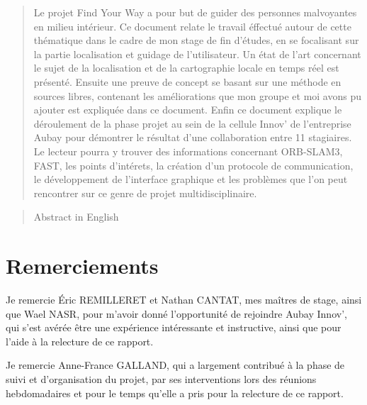 \documentclass[11pt]{article}
\begin{document}
  \begin{abstract}

    Le projet Find Your Way a pour but de guider des personnes malvoyantes en milieu intérieur. Ce document relate le travail éffectué autour
    de cette thématique dans le cadre de mon stage de fin d'études, en se focalisant sur la partie localisation et guidage de l'utilisateur.
    Un état de l'art concernant le sujet de la localisation et de la cartographie locale en temps réel est présenté. Ensuite une preuve de
    concept se basant sur une méthode en sources libres, contenant les améliorations que mon groupe et moi avons pu ajouter est expliquée 
    dans ce document. Enfin ce document explique le déroulement de la phase projet au sein de la cellule Innov' de l'entreprise Aubay
    pour démontrer le résultat d'une collaboration entre 11 stagiaires. Le lecteur pourra y trouver des informations concernant ORB-SLAM3,
    FAST, les points d'intérets, la création d'un protocole de communication, le développement de l'interface graphique et les problèmes 
    que l'on peut rencontrer sur ce genre de projet multidisciplinaire.

  \end{abstract}
  \pagebreak

  \begin{abstract}
    Abstract in English
  \end{abstract}
  \pagebreak

  \setcounter{tocdepth}{3}
  \tableofcontents

  \pagebreak

  \section{Remerciements}    
    Je remercie Éric REMILLERET et Nathan CANTAT, mes maîtres de stage, 
    ainsi que Wael NASR, pour m'avoir donné l'opportunité de rejoindre 
    Aubay Innov', qui s'est avérée être une expérience intéressante 
    et instructive, ainsi que pour l'aide à la relecture de ce rapport.    
    
    Je remercie Anne-France GALLAND, qui a largement contribué à la phase de suivi et d'organisation du projet, par ses interventions 
    lors des réunions hebdomadaires et pour le temps qu'elle a pris pour la relecture de ce rapport.    
    
\end{document}
